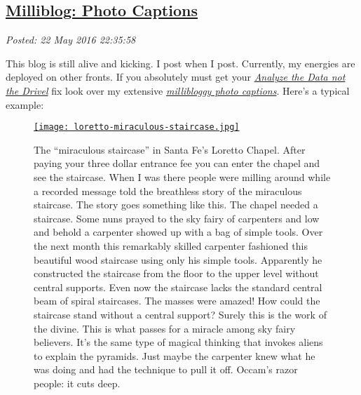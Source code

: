 %

\subsection*{\href{https://bakerjd99.wordpress.com/2016/05/22/milliblog-photo-captions/}{Milliblog: Photo Captions}}


\noindent\emph{Posted: 22 May 2016 22:35:58}
\vspace{6pt}

This blog is still alive and kicking. I post when I post. Currently, my
energies are deployed on other fronts. If you absolutely must get your
\emph{\href{https://bakerjd99.wordpress.com/}{Analyze the Data not the
Drivel}} fix look over my extensive
\emph{\href{https://conceptcontrol.smugmug.com/}{millibloggy photo
captions}}. Here's a typical example:

\captionsetup[figure]{labelformat=empty}
\begin{figure}[htbp]
\centering
\href{https://conceptcontrol.smugmug.com/Places/USA-and-Canada/New-Mexico-Montage/i-D79vhKg/A}{\texttt{[image: loretto-miraculous-staircase.jpg]}}
\caption{The ``miraculous staircase'' in Santa Fe's Loretto Chapel. After paying
your three dollar entrance fee you can enter the chapel and see the
staircase. When I was there people were milling around while a recorded
message told the breathless story of the miraculous staircase. The story
goes something like this. The chapel needed a staircase. Some nuns
prayed to the sky fairy of carpenters and low and behold a carpenter
showed up with a bag of simple tools. Over the next month this
remarkably skilled carpenter fashioned this beautiful wood staircase
using only his simple tools. Apparently he constructed the staircase
from the floor to the upper level without central supports. Even now the
staircase lacks the standard central beam of spiral staircases. The
masses were amazed! How could the staircase stand without a central
support? Surely this is the work of the divine. This is what passes for
a miracle among sky fairy believers. It's the same type of magical
thinking that invokes aliens to explain the pyramids. Just maybe the
carpenter knew what he was doing and had the technique to pull it off.
Occam's razor people: it cuts deep.}
\label{fig:5249X0}
\end{figure}



%
